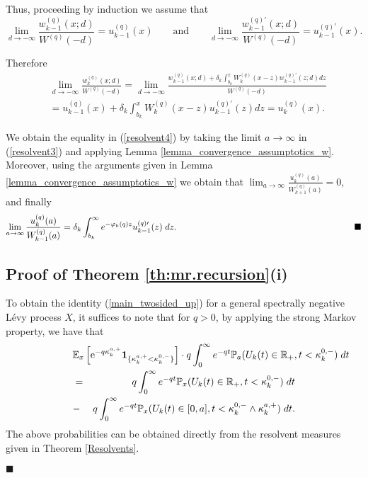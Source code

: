 \documentclass[12pt,reqno]{amsart}
\theoremstyle{definition}
\theoremstyle{remark}
\newcommand{\e}{\mathbb{E}}
\newcommand{\ind}{\mathbf{1}}
\begin{document}
Thus, proceeding by induction we assume that 
\begin{equation}\label{limit-d}
\lim_{d\to-\infty} \frac{ w_{k-1}^{(q)}(x;d)}{W^{(q)}(-d)} =u_{k-1}^{(q)}(x)
\qquad \textrm{and} \qquad 
\lim_{d\to-\infty} \frac{ w_{k-1}^{(q)\prime}(x;d)}{W^{(q)}(-d)} =u_{k-1}^{(q)\prime}(x).
\end{equation} 

Therefore
\begin{align*}\nonumber
&\lim_{d\to -\infty}\frac{ w_{k}^{(q)}(x;d)}{W^{(q)}(-d)}=\lim_{d\to -\infty}\frac{
w_{k-1}^{(q)}(x;d) + \delta_k\int_{b_k}^x W_k^{(q)}(x-z) w_{k-1}^{(q)\prime}(z;d)dz}{W^{(q)}(-d)}\\&
= u_{k-1}^{(q)}(x) + \delta_k\int_{b_k}^x W_k^{(q)}(x-z) u_{k-1}^{(q)\prime}(z)dz=u_k^{(q)}(x).
\end{align*}

We obtain the equality in (\ref{resolvent4}) by taking the limit $a \rightarrow \infty $ in (\ref{resolvent3}) and applying 
Lemma \ref{lemma_convergence_assumptotics_w}. Moreover, using the arguments given in Lemma \ref{lemma_convergence_assumptotics_w} 
we obtain that
$ \lim_{a\to\infty}\frac{u_k^{(q)}(a)}{W_{k+1}^{(q)}(a)}=0$,
and finally 
$$
\lim_{a\to\infty} \frac{ u_{k}^{(q)}(a)}{W_{k-1}^{(q)}(a)} = 
\delta_k \int_{b_k}^{\infty} e^{-\varphi_k(q)z} u_{k-1}^{(q)\prime}(z)\;dz. \textrm{\hspace{7cm}} \blacksquare $$

\subsection{Proof of Theorem \ref{th:mr.recursion}(i)}
To obtain the identity (\ref{main_twosided_up}) for a general spectrally negative L\'evy process $X$, it suffices to note that for $q >0$, by applying the 
strong Markov property, we have that
\begin{eqnarray*}
	\lefteqn{\e_x \left[ \mathrm{e}^{-q \kappa_k^{a,+}} \ind_{\{\kappa_k^{a,+}<\kappa_k^{0,-}\}} \right] \cdot q\int_0^{\infty}e^{-qt}
		\mathbb{P}_a(U_k(t)\in \mathbb{R}_+,t<\kappa_k^{0,-})\;dt}\\&=&
	q\int_0^{\infty}e^{-qt}\mathbb{P}_x(U_k(t)\in \mathbb{R}_+,t<\kappa_k^{0,-})\;dt\\
	&-& q\int_0^{\infty}e^{-qt}\mathbb{P}_x(U_k(t)\in [0,a],t<\kappa_k^{0,-}\wedge\kappa_k^{a,+})\;dt.
\end{eqnarray*}
The above probabilities can be obtained directly from the resolvent  measures given in Theorem \ref{Resolvents}.
\begin{flushright}$\blacksquare$\end{flushright}
\end{document}
